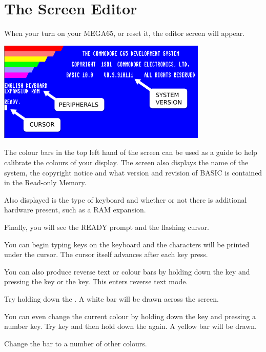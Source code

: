 \section{The Screen Editor}

When your turn on your MEGA65, or reset it, the editor screen will appear.

\begin{center}
\includegraphics[width={10cm}]{images/introduction-screen/layout.png}
\end{center}

The colour bars in the top left hand of the screen can be used as a guide to help calibrate the colours of your display. The screen also displays the name of the system, the copyright notice and what version and revision of BASIC is contained in the Read-only Memory.

Also displayed is the type of keyboard and whether or not there is additional hardware present, such as a RAM expansion.

Finally, you will see the READY prompt and the flashing cursor.

You can begin typing keys on the keyboard and the characters will be printed under the cursor. The cursor itself advances after each key press.

You can also produce reverse text or colour bars by holding down the  key and pressing the  key or the  key. This enters reverse text mode.

Try holding down the . A white bar will be drawn across the screen.

You can even change the current colour by holding down the  key and pressing a number key. Try key  and then hold down the  again. A yellow bar will be drawn.

Change the bar to a number of other colours.

